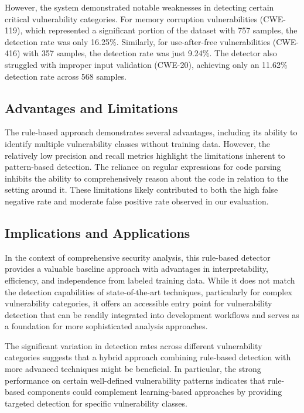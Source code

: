 \documentclass{article}
\begin{document}
However, the system demonstrated notable weaknesses in detecting certain critical vulnerability categories. For memory corruption vulnerabilities (CWE-119), which represented a significant portion of the dataset with 757 samples, the detection rate was only 16.25\%. Similarly, for use-after-free vulnerabilities (CWE-416) with 357 samples, the detection rate was just 9.24\%. The detector also struggled with improper input validation (CWE-20), achieving only an 11.62\% detection rate across 568 samples.

\subsection{Advantages and Limitations}

The rule-based approach demonstrates several advantages, including its ability to identify multiple vulnerability classes without training data. However, the relatively low precision and recall metrics highlight the limitations inherent to pattern-based detection. The reliance on regular expressions for code parsing inhibits the ability to comprehensively reason about the code in relation to the setting around it. These limitations likely contributed to both the high false negative rate and moderate false positive rate observed in our evaluation.

\subsection{Implications and Applications}
In the context of comprehensive security analysis, this rule-based detector provides a valuable baseline approach with advantages in interpretability, efficiency, and independence from labeled training data. While it does not match the detection capabilities of state-of-the-art techniques, particularly for complex vulnerability categories, it offers an accessible entry point for vulnerability detection that can be readily integrated into development workflows and serves as a foundation for more sophisticated analysis approaches.

The significant variation in detection rates across different vulnerability categories suggests that a hybrid approach combining rule-based detection with more advanced techniques might be beneficial. In particular, the strong performance on certain well-defined vulnerability patterns indicates that rule-based components could complement learning-based approaches by providing targeted detection for specific vulnerability classes.
\end{document}

